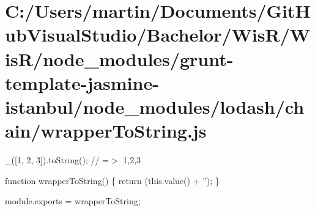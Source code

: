 \hypertarget{_c_1_2_users_2martin_2_documents_2_git_hub_visual_studio_2_bachelor_2_wis_r_2_wis_r_2node_modulef3181bfeb79f584f8a76a020f45ee39e}{}\section{C\+:/\+Users/martin/\+Documents/\+Git\+Hub\+Visual\+Studio/\+Bachelor/\+Wis\+R/\+Wis\+R/node\+\_\+modules/grunt-\/template-\/jasmine-\/istanbul/node\+\_\+modules/lodash/chain/wrapper\+To\+String.\+js}
\+\_\+(\mbox{[}1, 2, 3\mbox{]}).to\+String(); // =$>$ \textquotesingle{}1,2,3\textquotesingle{}


\begin{DoxyCodeInclude}

\textcolor{keyword}{function} wrapperToString() \{
  \textcolor{keywordflow}{return} (this.value() + \textcolor{stringliteral}{''});
\}

module.exports = wrapperToString;
\end{DoxyCodeInclude}
 